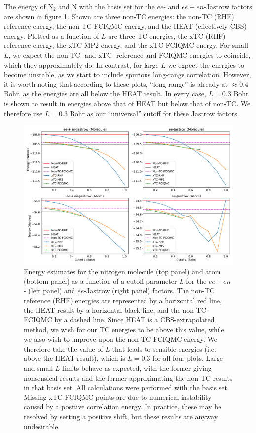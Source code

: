 The energy of N$_2$ and N with the \avtz basis set for the $ee$- and $ee+en$-Jastrow factors are shown in figure \ref{fig:fournais-cutoff-n2}. Shown are three non-TC energies: the non-TC (RHF) reference energy, the non-TC-FCIQMC energy, and the HEAT (effectively \gls{CBS}) energy. Plotted as a function of $L$ are three TC energies, the xTC (RHF) reference energy, the xTC-MP2 energy, and the xTC-FCIQMC energy. For small $L$, we expect the non-TC- and xTC- reference and FCIQMC energies to coincide, which they approximately do. In contrast, for large $L$ we expect the energies to become unstable, as we start to include spurious long-range correlation. However, it is worth noting that according to these plots, ``long-range'' is already at $\approx 0.4$ Bohr, as the energies are all below the HEAT result. In every case, $L=0.3$ Bohr is shown to result in energies above that of HEAT but below that of non-TC. We therefore use $L=0.3$ Bohr as our ``universal'' cutoff for these Jastrow factors.

\begin{figure}[h!]
    \centering
    \includegraphics[width=\textwidth]{figures/universal/cutoffs_combined}
    \caption{Energy estimates for the nitrogen molecule (top panel) and atom (bottom panel) as a function of a cutoff parameter $L$ for the $ee+en$- (left panel) and $ee$-Jastrow (right panel) factors. The non-TC reference (RHF) energies are represented by a horizontal red line, the HEAT result by a horizontal black line, and the non-TC-FCIQMC by a dashed line. Since HEAT is a \gls{CBS}-extrapolated method, we wish for our TC energies to be above this value, while we also wish to improve upon the non-TC-FCIQMC energy. We therefore take the value of $L$ that leads to sensible energies (i.e. above the HEAT result), which is $L=0.3$ for all four plots. Large- and small-$L$ limits behave as expected, with the former giving nonsensical results and the former approximating the non-TC results in that basis set. All calculations were performed with the \avtz basis set. Missing xTC-FCIQMC points are due to numerical instability caused by a positive correlation energy. In practice, these may be resolved by setting a positive shift, but these results are anyway undesirable.}
    \label{fig:fournais-cutoff-n2}
\end{figure}

